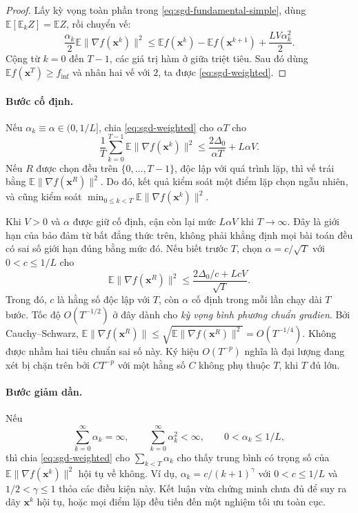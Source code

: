 \begin{proof}
Lấy kỳ vọng toàn phần trong \eqref{eq:sgd-fundamental-simple}, dùng
$\mathbb{E}[\mathbb{E}_k Z]=\mathbb{E}Z$, rồi chuyển vế:
\[
 \frac{\alpha_k}{2}\mathbb{E}\|\nabla f(\mathbf{x}^{k})\|^2
 \leq\mathbb{E}f(\mathbf{x}^{k})-
       \mathbb{E}f(\mathbf{x}^{k+1})+\frac{LV\alpha_k^2}{2}.
\]
Cộng từ $k=0$ đến $T-1$, các giá trị hàm ở giữa triệt tiêu. Sau đó dùng
$\mathbb{E}f(\mathbf{x}^{T})\geq f_{\inf}$ và nhân hai vế với $2$,
ta được \eqref{eq:sgd-weighted}.
\end{proof}

\paragraph{Bước cố định.}
Nếu $\alpha_k\equiv\alpha\in(0,1/L]$, chia \eqref{eq:sgd-weighted}
cho $\alpha T$ cho
\begin{equation}
 \frac{1}{T}\sum_{k=0}^{T-1}\mathbb{E}\|\nabla f(\mathbf{x}^{k})\|^2
 \leq\frac{2\Delta_0}{\alpha T}+L\alpha V.
 \label{eq:sgd-nonconvex-constant}
\end{equation}
Nếu $R$ được chọn đều trên $\{0,\ldots,T-1\}$, độc lập với quá trình
lặp, thì vế trái bằng $\mathbb{E}\|\nabla f(\mathbf{x}^{R})\|^2$.
Do đó, kết quả kiểm soát một điểm lặp chọn ngẫu nhiên, và cũng kiểm soát
$\min_{0\leq k<T}\mathbb{E}\|\nabla f(\mathbf{x}^{k})\|^2$.

Khi $V>0$ và $\alpha$ được giữ cố định, cận còn lại mức $L\alpha V$ khi
$T\to\infty$. Đây là giới hạn của bảo đảm từ bất đẳng thức trên, không
phải khẳng định mọi bài toán đều có sai số giới hạn đúng bằng mức đó.
Nếu biết trước $T$, chọn
$\alpha=c/\sqrt{T}$ với $0<c\leq1/L$ cho
\begin{equation}
 \mathbb{E}\|\nabla f(\mathbf{x}^{R})\|^2
 \leq\frac{2\Delta_0/c+LcV}{\sqrt{T}}.
 \label{eq:sgd-nonconvex-rate}
\end{equation}
Trong đó, $c$ là hằng số độc lập với $T$, còn $\alpha$ cố định trong mỗi
lần chạy dài $T$ bước. Tốc độ $O(T^{-1/2})$ ở đây dành cho
\emph{kỳ vọng bình phương chuẩn građien}. Bởi Cauchy--Schwarz,
$\mathbb{E}\|\nabla f(\mathbf{x}^{R})\|
\leq\sqrt{\mathbb{E}\|\nabla f(\mathbf{x}^{R})\|^2}=O(T^{-1/4})$.
Không được nhầm hai tiêu chuẩn sai số này. Ký hiệu $O(T^{-p})$ nghĩa là
đại lượng đang xét bị chặn trên bởi $C T^{-p}$ với một hằng số $C$ không
phụ thuộc $T$, khi $T$ đủ lớn.

\paragraph{Bước giảm dần.}
Nếu
\begin{equation}
 \sum_{k=0}^{\infty}\alpha_k=\infty,
 \qquad \sum_{k=0}^{\infty}\alpha_k^2<\infty,
 \qquad 0<\alpha_k\leq1/L,
 \label{eq:sgd-diminishing}
\end{equation}
thì chia \eqref{eq:sgd-weighted} cho $\sum_{k<T}\alpha_k$ cho thấy
trung bình có trọng số của $\mathbb{E}\|\nabla f(\mathbf{x}^{k})\|^2$
hội tụ về không. Ví dụ, $\alpha_k=c/(k+1)^{\gamma}$ với
$0<c\leq1/L$ và $1/2<\gamma\leq1$ thỏa các điều kiện này.
Kết luận vừa chứng minh chưa đủ để suy ra dãy $\mathbf{x}^{k}$ hội tụ,
hoặc mọi điểm lặp đều tiến đến một nghiệm tối ưu toàn cục.

